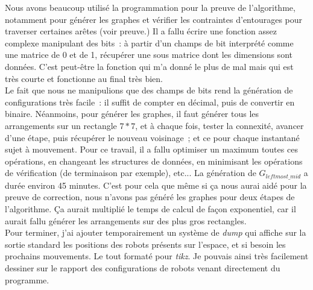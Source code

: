 Nous avons beaucoup utilisé la programmation pour la preuve de l'algorithme,
notamment pour générer les graphes et vérifier les contraintes d'entourages
pour traverser certaines arêtes (voir preuve.) Il a fallu écrire une fonction
assez complexe manipulant des bits~: à partir d'un champs de bit
interprété comme une matrice de 0 et de 1, récupérer une sous matrice dont les
dimensions sont données. C'est peut-être la fonction qui m'a donné le plus de
mal mais qui est très courte et fonctionne au final très bien. \\

Le fait que nous ne manipulions que des champs de bits rend la génération de
configurations très facile~: il suffit de compter en décimal, puis de convertir
en binaire. Néanmoins, pour générer les graphes, il faut générer tous les
arrangements sur un rectangle $7*7$, et à chaque fois, tester la connexité,
avancer d'une étape, puis récupérer le nouveau voisinage~; et ce pour chaque
instantané sujet à mouvement. Pour ce travail, il a fallu optimiser un maximum
toutes ces opérations, en changeant les structures de données, en minimisant
les opérations de vérification (de terminaison par exemple), etc... La
génération de $G_{leftmost\_mid}$ a durée environ 45 minutes. C'est pour cela
que même si ça nous aurai aidé pour la preuve de correction, nous n'avons pas
généré les graphes pour deux étapes de l'algorithme. Ça aurait multiplié le
temps de calcul de façon exponentiel, car il aurait fallu générer les
arrangements sur des plus gros rectangles. \\

Pour terminer, j'ai ajouter temporairement un système de \emph{dump} qui
affiche sur la sortie standard les positions des robots présents sur l'espace,
et si besoin les prochains mouvements. Le tout formaté pour \emph{tikz}. Je
pouvais ainsi très facilement dessiner sur le rapport des configurations de
robots venant directement du programme.

